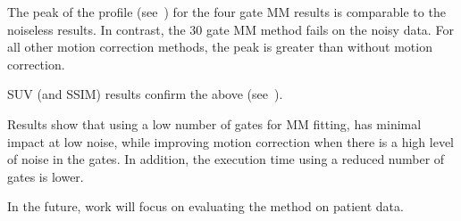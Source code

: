             The peak of the profile (see~) for the four gate \gls{MM} results is comparable to the noiseless results. In contrast, the $30$ gate \gls{MM} method fails on the noisy data. For all other motion correction methods, the peak is greater than without motion correction.
             
            \gls{SUV} (and \gls{SSIM}) results confirm the above (see~).
        
        Results show that using a low number of gates for \gls{MM} fitting, has minimal impact at low noise, while improving motion correction when there is a high level of noise in the gates. In addition, the execution time using a reduced number of gates is lower.
            
        In the future, work will focus on evaluating the method on patient data.
